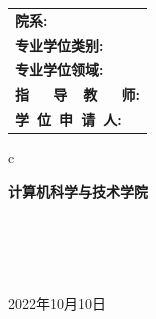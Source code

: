\vskip 1.0cm

\begin{center}
	\renewcommand\arraystretch{1.5}
	\begin{tabular}{l}
		{\sihao \bf 院\qquad\qquad 系:} \\
		{\sihao \bf 专业学位类别:}      \\
		{\sihao \bf 专业学位领域:}      \\
		{\sihao \bf 指~~~导~~教~~~师:}      \\
		{\sihao \bf 学~位~申~请~人:}
	\end{tabular}
	\begin{tabular}c

		{\sihao \bf  \qquad 计算机科学与技术学院 \qquad} \\
		                  \\
		                 \\
		                     \\
		                     \\


		\hline
	\end{tabular}
\end{center}

\vskip 2.0cm

\begin{center}
	{\sihao 2022年10月10日}
\end{center}
